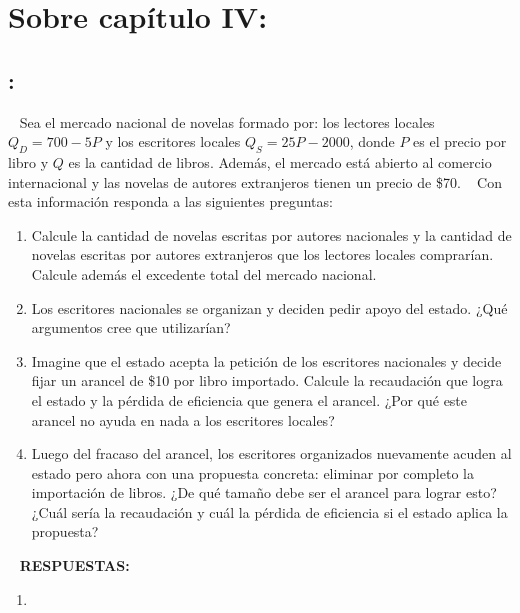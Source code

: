 \documentclass[
  letterpaper,
  DIV=11,
  numbers=noendperiod]{scrreport}
\providecommand{\tightlist}{%
  \setlength{\itemsep}{0pt}\setlength{\parskip}{0pt}}\usepackage{longtable,booktabs,array}
\begin{document}
\hypertarget{sobre-capuxedtulo-iv}{%
\section{Sobre capítulo IV:}\label{sobre-capuxedtulo-iv}}

\hypertarget{section-13}{%
\subsection{:}\label{section-13}}

~ Sea el mercado nacional de novelas formado por: los lectores locales
\(Q_D = 700 - 5P\) y los escritores locales \(Q_S = 25P - 2000\), donde
\(P\) es el precio por libro y \(Q\) es la cantidad de libros. Además,
el mercado está abierto al comercio internacional y las novelas de
autores extranjeros tienen un precio de \$70. ~ Con esta información
responda a las siguientes preguntas:

\begin{enumerate}
\def\labelenumi{\alph{enumi})}
\item
  Calcule la cantidad de novelas escritas por autores nacionales y la
  cantidad de novelas escritas por autores extranjeros que los lectores
  locales comprarían. Calcule además el excedente total del mercado
  nacional.
\item
  Los escritores nacionales se organizan y deciden pedir apoyo del
  estado. ¿Qué argumentos cree que utilizarían?
\item
  Imagine que el estado acepta la petición de los escritores nacionales
  y decide fijar un arancel de \$10 por libro importado. Calcule la
  recaudación que logra el estado y la pérdida de eficiencia que genera
  el arancel. ¿Por qué este arancel no ayuda en nada a los escritores
  locales?
\item
  Luego del fracaso del arancel, los escritores organizados nuevamente
  acuden al estado pero ahora con una propuesta concreta: eliminar por
  completo la importación de libros. ¿De qué tamaño debe ser el arancel
  para lograr esto? ¿Cuál sería la recaudación y cuál la pérdida de
  eficiencia si el estado aplica la propuesta?

  \par
\end{enumerate}

~ \textbf{RESPUESTAS:}

\begin{enumerate}
\def\labelenumi{\alph{enumi})}
\tightlist
\item
\end{enumerate}
\end{document}
